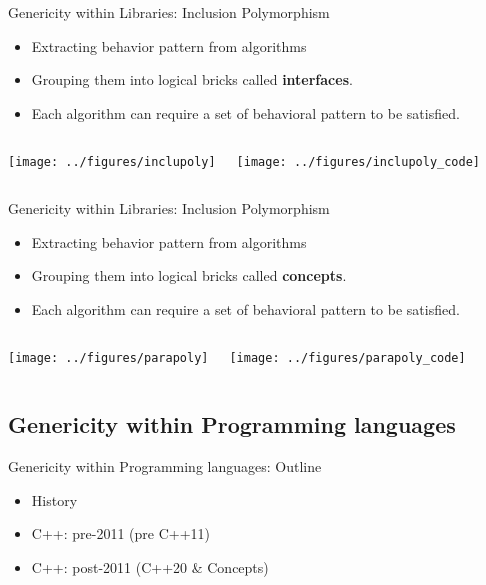 \documentclass[12pt,aspectratio=169]{beamer}
\begin{document}
\begin{frame}[fragile]{Genericity within Libraries: Inclusion Polymorphism}
  \begin{itemize}
    \item Extracting behavior pattern from algorithms
    \item Grouping them into logical bricks called \textbf{interfaces}.
    \item Each algorithm can require a set of behavioral pattern to be satisfied.
  \end{itemize}

  \begin{columns}[T,onlytextwidth]
    \centering
    \texttt{[image: ../figures/inclupoly]}

    \centering
    \texttt{[image: ../figures/inclupoly\_code]}
  \end{columns}
\end{frame}

\begin{frame}[fragile]{Genericity within Libraries: Inclusion Polymorphism}
  \begin{itemize}
    \item Extracting behavior pattern from algorithms
    \item Grouping them into logical bricks called \textbf{concepts}.
    \item Each algorithm can require a set of behavioral pattern to be satisfied.
  \end{itemize}

  \begin{columns}[T,onlytextwidth]
    \centering
    \texttt{[image: ../figures/parapoly]}

    \centering
    \texttt{[image: ../figures/parapoly\_code]}
  \end{columns}
\end{frame}

\subsection[Genericity within Programming languages]{Genericity within Programming languages}

\begin{frame}[fragile]{Genericity within Programming languages: Outline}
  \begin{itemize}
    \item History
    \item C++: pre-2011 (pre C++11)
    \item C++: post-2011 (C++20 \& Concepts)
  \end{itemize}
\end{frame}
\end{document}
